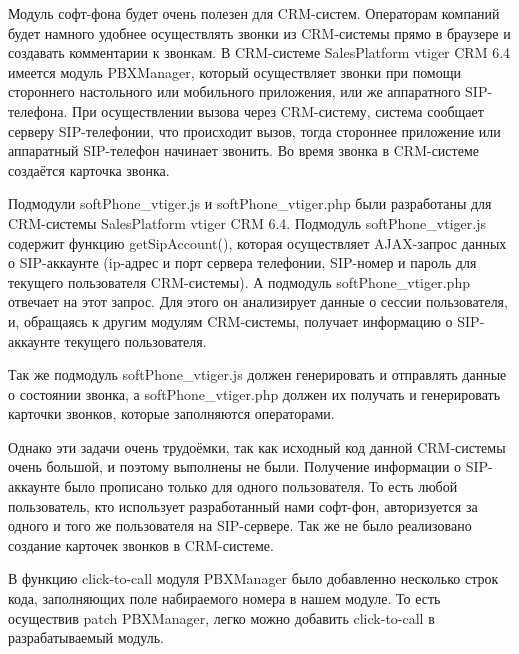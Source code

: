 Модуль софт-фона будет очень полезен для CRM-систем. Операторам компаний будет намного удобнее осуществлять звонки из CRM-системы прямо в браузере и создавать комментарии к звонкам. В CRM-системе SalesPlatform vtiger CRM 6.4 имеется модуль PBXManager, который осуществляет звонки при помощи стороннего настольного или мобильного приложения, или же аппаратного SIP-телефона. При осуществлении вызова через CRM-систему, система сообщает серверу SIP-телефонии, что происходит вызов, тогда стороннее приложение или аппаратный SIP-телефон начинает звонить. Во время звонка в CRM-системе создаётся карточка звонка.

Подмодули softPhone\_vtiger.js и softPhone\_vtiger.php были разработаны для CRM-системы SalesPlatform vtiger CRM 6.4. Подмодуль softPhone\_vtiger.js содержит функцию getSipAccount(), которая осуществляет AJAX-запрос данных о SIP-аккаунте (ip-адрес и порт сервера телефонии, SIP-номер и пароль для текущего пользователя CRM-системы). А подмодуль softPhone\_vtiger.php отвечает на этот запрос. Для этого он анализирует данные о сессии пользователя, и, обращаясь к другим модулям CRM-системы, получает информацию о SIP-аккаунте текущего пользователя.

Так же подмодуль softPhone\_vtiger.js должен генерировать и отправлять данные о состоянии звонка, а softPhone\_vtiger.php должен их получать и генерировать карточки звонков, которые заполняются операторами.

Однако эти задачи очень трудоёмки, так как исходный код данной CRM-системы очень большой, и поэтому выполнены не были. Получение информации о SIP-аккаунте было прописано только для одного пользователя. То есть любой пользователь, кто использует разработанный нами софт-фон, авторизуется за одного и того же пользователя на SIP-сервере. Так же не было реализовано создание карточек звонков в CRM-системе.

В функцию click-to-call модуля PBXManager было добавленно несколько строк кода, заполняющих поле набираемого номера в нашем модуле. То есть осуществив patch PBXManager, легко можно добавить click-to-call в разрабатываемый модуль.